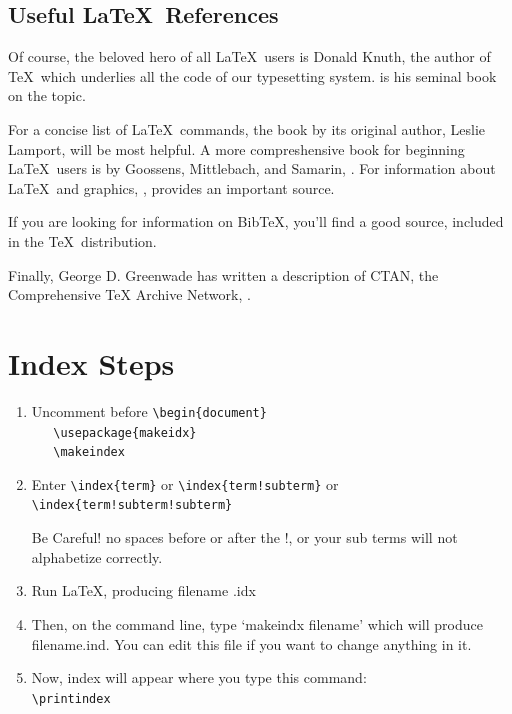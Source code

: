 \documentclass{mitpress}
\begin{document}
\section{Useful \LaTeX\ References}

Of course, the beloved hero of all \LaTeX\ users is Donald Knuth,
the author of \TeX\ which underlies all the code of our
typesetting system. \cite{knuth79} is his seminal
book on the topic. 

For a concise list of \LaTeX\ commands, the book by its
original author, Leslie Lamport, \cite{lamport94}
will be most helpful.
A more compreshensive book for beginning \LaTeX\ users is by
Goossens, Mittlebach, and Samarin, \cite{goossens93}.
For information about \LaTeX\ and graphics, 
\cite[255]{rahtz89}, provides an important source.

If you are looking for information on Bib\TeX, you'll
find \cite{patashnik88} a good source, included in
the \TeX\ distribution.

Finally, George D. Greenwade has written a description of
CTAN, the Comprehensive TeX Archive Network, \cite{greenwade93}.



\chapter{Index Steps}
\begin{enumerate}
\item
 Uncomment before \verb+\begin{document}+\\
\verb+   \usepackage{makeidx}+\\
\verb+   \makeindex+


\item
Enter \verb+\index{term}+ or \verb+\index{term!subterm}+ 
or \verb+\index{term!subterm!subterm}+

Be Careful!  no spaces before or after the !, or your sub terms will
not alphabetize correctly.

\item
 Run LaTeX, producing filename .idx

\item
Then, on the command line, type `makeindx filename' which will
     produce filename.ind. You can edit this file if you want to change
     anything in it.

\item Now, index will appear where you type this command:\\
\verb+\printindex+
\end{enumerate}
\end{document}
